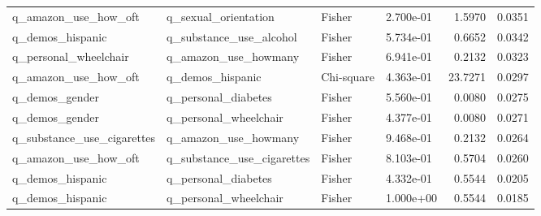 \begin{longtable}[t]{llllrr}
\addlinespace
q\_amazon\_use\_how\_oft & q\_sexual\_orientation & Fisher & 2.700e-01 & 1.5970 & 0.0351\\
q\_demos\_hispanic & q\_substance\_use\_alcohol & Fisher & 5.734e-01 & 0.6652 & 0.0342\\
q\_personal\_wheelchair & q\_amazon\_use\_howmany & Fisher & 6.941e-01 & 0.2132 & 0.0323\\
q\_amazon\_use\_how\_oft & q\_demos\_hispanic & Chi-square & 4.363e-01 & 23.7271 & 0.0297\\
q\_demos\_gender & q\_personal\_diabetes & Fisher & 5.560e-01 & 0.0080 & 0.0275\\
\addlinespace
q\_demos\_gender & q\_personal\_wheelchair & Fisher & 4.377e-01 & 0.0080 & 0.0271\\
q\_substance\_use\_cigarettes & q\_amazon\_use\_howmany & Fisher & 9.468e-01 & 0.2132 & 0.0264\\
q\_amazon\_use\_how\_oft & q\_substance\_use\_cigarettes & Fisher & 8.103e-01 & 0.5704 & 0.0260\\
q\_demos\_hispanic & q\_personal\_diabetes & Fisher & 4.332e-01 & 0.5544 & 0.0205\\
q\_demos\_hispanic & q\_personal\_wheelchair & Fisher & 1.000e+00 & 0.5544 & 0.0185\\*
\end{longtable}
\endgroup{}
